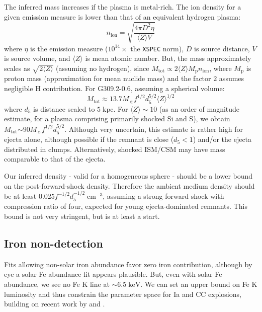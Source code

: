 \documentclass[preprint2,tighten,trackchanges]{aastex6}
\newcommand*{\mt}{\mathrm}
\newcommand*{\unit}[1]{\;\mt{#1}}  %
\newcommand*{\abt}{\mathord{\sim}} %
\begin{document}
The inferred mass increases if the plasma is metal-rich.
The ion density for a given emission measure is lower than that of an
equivalent hydrogen plasma:
\[
    n_{\mt{ion}} = \sqrt{\frac{4 \pi D^2 \eta}{\langle Z \rangle V}}
\]
where $\eta$ is the emission measure ($10^{14}\times$ the \texttt{XSPEC} norm),
$D$ is source distance, $V$ is source volume, and $\langle Z \rangle$ is mean
atomic number.
But, the mass approximately scales as $\sqrt{2 \langle Z \rangle}$ (assuming no
hydrogen), since
$M_{\mt{tot}} \propto 2 \langle Z \rangle M_{\mt{p}} n_{\mt{ion}}$,
where $M_{\mt{p}}$ is proton mass (approximation for mean nuclide mass) and the
factor $2$ assumes negligible H contribution.
For G309.2-0.6, assuming a spherical volume:
\[
    M_{\mt{tot}} \approx 13.7 M_{\sun} f^{1/2} d_5^{5/2} \langle Z \rangle^{1/2}
\]
where $d_5$ is distance scaled to $5 \unit{kpc}$.
For $\langle Z \rangle \sim 10$ (as an order of magnitude estimate, for a
plasma comprising primarily shocked Si and S), we obtain
$M_{\mt{tot}} \abt 90 M_{\sun} f^{1/2} d_5^{5/2}$.
Although very uncertain, this estimate is rather high for ejecta alone,
although possible if the remnant is close ($d_5 < 1$) and/or the ejecta
distributed in clumps.
Alternatively, shocked ISM/CSM may have mass comparable to that of the ejecta.

Our inferred density - valid for a homogeneous sphere - should be a lower bound
on the post-forward-shock density.
Therefore the ambient medium density should be at least
$0.025 f^{-1/2} d_{5}^{-1/2} \unit{cm^{-3}}$, assuming a strong forward shock
with compression ratio of four, expected for young ejecta-dominated remnants.
This bound is not very stringent, but is at least a start.

\subsection{Iron non-detection}

Fits allowing non-solar iron abundance favor zero iron contribution, although
by eye a solar Fe abundance fit appears plausible.
But, even with solar Fe abundance, we see no Fe K line at $\abt 6.5 \unit{keV}$.
We can set an upper bound on Fe K luminosity and thus constrain the parameter
space for Ia and CC explosions, building on recent work by
\citet{yamaguchi2014-iron} and \citet{patnaude2015}.
\end{document}
